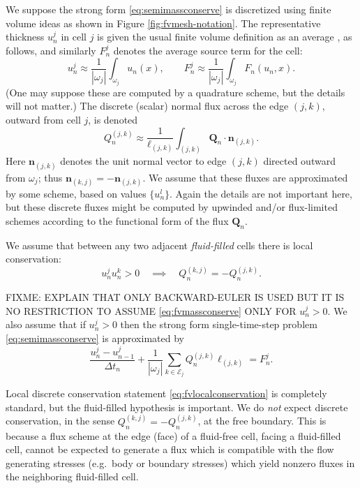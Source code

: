 \documentclass[final,onefignum]{siamart190516}
\newcommand\bn{\mathbf{n}}
\newcommand\bQ{\mathbf{Q}}
\begin{document}
We suppose the strong form \eqref{eq:semimassconserve} is discretized using finite volume ideas as shown in Figure \ref{fig:fvmesh-notation}.  The representative thickness $u_n^j$ in cell $j$ is given the usual finite volume definition as an average \cite{LeVeque2002}, as follows, and similarly $F_n^j$ denotes the average source term for the cell:
\begin{equation}
u_n^j \approx \frac{1}{|\omega_j|} \int_{\omega_j} u_n(x), \qquad F_n^j \approx \frac{1}{|\omega_j|} \int_{\omega_j} F_n(u_n,x).  \label{eq:fvthickness}
\end{equation}
(One may suppose these are computed by a quadrature scheme, but the details will not matter.)  The discrete (scalar) normal flux across the edge $(j,k)$, outward from cell $j$, is denoted
\begin{equation}
Q_n^{(j,k)} \approx \frac{1}{\ell_{(j,k)}} \int_{(j,k)} \bQ_n \cdot \bn_{(j,k)}. \label{eq:fvflux}
\end{equation}
Here $\bn_{(j,k)}$ denotes the unit normal vector to edge $(j,k)$ directed outward from $\omega_j$; thus $\bn_{(k,j)} = -\bn_{(j,k)}$.  We assume that these fluxes are approximated by some scheme, based on values $\{u_n^l\}$.  Again the details are not important here, but these discrete fluxes might be computed by upwinded and/or flux-limited schemes \cite{LeVeque2002} according to the functional form of the flux $\bQ_n$.

We assume that between any two adjacent \emph{fluid-filled} cells there is local conservation:
\begin{equation}
  u_n^j u_n^k > 0 \quad \implies \quad Q_n^{(k,j)}=-Q_n^{(j,k)}.  \label{eq:fvlocalconservation}
\end{equation}

FIXME: EXPLAIN THAT ONLY BACKWARD-EULER IS USED BUT IT IS NO RESTRICTION TO ASSUME \eqref{eq:fvmassconserve} ONLY FOR $u_n^j > 0$.  We also assume that if $u_n^j>0$ then the strong form single-time-step problem \eqref{eq:semimassconserve} is approximated by
\begin{equation}
\frac{u_n^j - u_{n-1}^j}{\Delta t_n} + \frac{1}{|\omega_j|} \sum_{k\in \mathcal{E}_j} Q_n^{(j,k)} \ell_{(j,k)} = F_n^j. \label{eq:fvmassconserve}
\end{equation}

Local discrete conservation statement \eqref{eq:fvlocalconservation} is completely standard, but the fluid-filled hypothesis is important.  We do \emph{not} expect discrete conservation, in the sense $Q_n^{(k,j)}=-Q_n^{(j,k)}$, at the free boundary.  This is because a flux scheme at the edge (face) of a fluid-free cell, facing a fluid-filled cell, cannot be expected to generate a flux which is compatible with the flow generating stresses (e.g.~body or boundary stresses) which yield nonzero fluxes in the neighboring fluid-filled cell.
\end{document}
